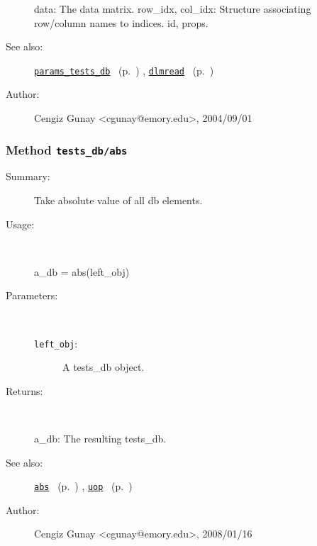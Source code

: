 \begin{description}
   data: The data matrix.
   row\_idx, col\_idx: Structure associating row/column names to indices.
   id, props.
%
%
\item[See also:]%
\hyperlink{ref_params_tests_db}{\texttt{params\_tests\_db}}%
\ (p.~\pageref{ref_params_tests_db})%
%
, \hyperlink{ref_dlmread}{\texttt{dlmread}}%
\ (p.~\pageref{ref_dlmread})%
%
%
\item[Author:]%
Cengiz Gunay <cgunay@emory.edu>, 2004/09/01
%
\end{description}
\methodline%
\subsubsection[Method \texttt{abs}]{Method \texttt{tests\_db/abs}}%
%
\label{ref_tests_db__abs}%
\hypertarget{ref_tests_db__abs}{}%
\begin{description}
\item[Summary:]Take absolute value of all db elements.
%
\item[Usage:]~%
\begin{lyxcode}%
a\_db = abs(left\_obj)
%
\end{lyxcode}%
%
%
\item[Parameters:]~
\begin{description}%
\item[\texttt{left\_obj}:]
 A tests\_db object.
\end{description}%
%
\item[Returns:
]~

   a\_db: The resulting tests\_db.
%
%
\item[See also:]%
\hyperlink{ref_abs}{\texttt{abs}}%
\ (p.~\pageref{ref_abs})%
%
, \hyperlink{ref_uop}{\texttt{uop}}%
\ (p.~\pageref{ref_uop})%
%
%
\item[Author:]%
Cengiz Gunay <cgunay@emory.edu>, 2008/01/16
%
\end{description}
\methodline%

